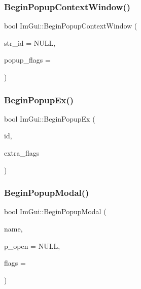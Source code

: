 \mbox{\label{namespaceImGui_aef8b2c0baa27bd5c68f676aaf14ed946}} 
\subsubsection{\texorpdfstring{Begin\+Popup\+Context\+Window()}{BeginPopupContextWindow()}}
{\footnotesize\ttfamily bool Im\+Gui\+::\+Begin\+Popup\+Context\+Window (\begin{DoxyParamCaption}\item[{const char $\ast$}]{str\+\_\+id = {\ttfamily NULL},  }\item[{Im\+Gui\+Popup\+Flags}]{popup\+\_\+flags = {} }\end{DoxyParamCaption})}

\mbox{\label{namespaceImGui_a89da3a22300e8293257b6cfdf1b83b7a}} 
\subsubsection{\texorpdfstring{Begin\+Popup\+Ex()}{BeginPopupEx()}}
{\footnotesize\ttfamily bool Im\+Gui\+::\+Begin\+Popup\+Ex (\begin{DoxyParamCaption}\item[{Im\+Gui\+ID}]{id,  }\item[{Im\+Gui\+Window\+Flags}]{extra\+\_\+flags }\end{DoxyParamCaption})}

\mbox{\label{namespaceImGui_a6d840f615c198c2342968f733fda11b3}} 
\subsubsection{\texorpdfstring{Begin\+Popup\+Modal()}{BeginPopupModal()}}
{\footnotesize\ttfamily bool Im\+Gui\+::\+Begin\+Popup\+Modal (\begin{DoxyParamCaption}\item[{const char $\ast$}]{name,  }\item[{bool $\ast$}]{p\+\_\+open = {\ttfamily NULL},  }\item[{Im\+Gui\+Window\+Flags}]{flags = {} }\end{DoxyParamCaption})}

